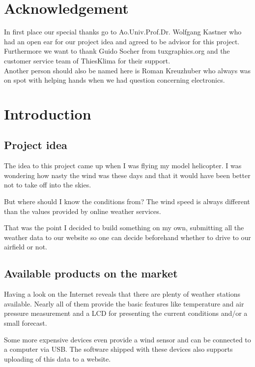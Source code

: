 
\chapter*{Acknowledgement}

In first place our special thanks go to Ao.Univ.Prof.Dr. Wolfgang Kastner who had an open ear for our project idea and agreed to be advisor for this project.\\[12pt]

\noindent Furthermore we want to thank Guido Socher from tuxgraphics.org and the customer service team of ThiesKlima for their support.\\[12pt]

\noindent Another person should also be named here is Roman Kreuzhuber who always was on spot with helping hands when we had question concerning electronics. 

\chapter{Introduction}

\section{Project idea}
The idea to this project came up when I was flying my model helicopter. I was wondering how nasty the wind was these days and that it would have been better not to take off into the skies.

But where should I know the conditions from? The wind speed is always different than the values provided by online weather services.

That was the point I decided to build something on my own, submitting all the weather data to our website so one can decide beforehand whether to drive to our airfield or not.

\section{Available products on the market}
Having a look on the Internet reveals that there are plenty of weather stations available. Nearly all of them provide the basic features like temperature and air pressure measurement and a LCD for presenting the current conditions and/or a small forecast.

Some more expensive devices even provide a wind sensor and can be connected to a computer via USB. The software shipped with these devices also supports uploading of this data to a website.

